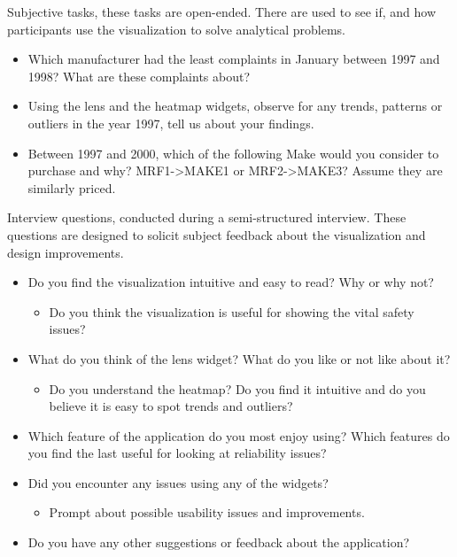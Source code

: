 \noindent 
Subjective tasks, these tasks are open-ended. There are used to see if, and how
participants use the visualization to solve analytical problems.

\begin{itemize}[noitemsep]
  \item Which manufacturer had the least complaints in January between 1997 and
  1998? What are these complaints about?
  \item Using the lens and the heatmap widgets, observe for any trends, patterns
  or outliers in the year 1997, tell us about your findings.
  \item Between 1997 and 2000, which of the following Make would you consider to
  purchase and why? MRF1->MAKE1 or MRF2->MAKE3? Assume they are similarly
  priced.
\end{itemize}

 
\noindent
Interview questions, conducted during a semi-structured interview. These
questions are designed to solicit subject feedback about the visualization and
design improvements.



\begin{itemize}
  \item Do you find the \threed visualization intuitive and easy to read? Why or
  why not?
  \begin{itemize}
    \item Do you think the visualization is useful for showing the vital safety
    issues?
  \end{itemize}
  
  \item What do you think of the lens widget? What do you like or not like about
  it?
  \begin{itemize}
    \item Do you understand the heatmap? Do you find it intuitive and do you
    believe it is easy to spot trends and outliers?
  \end{itemize}
  
  \item Which feature of the application do you most enjoy using? Which features
  do you find the last useful for looking at reliability issues? 
  
  \item Did you encounter any issues using any of the widgets? 
  \begin{itemize}
    \item  Prompt about possible usability issues and improvements.
  \end{itemize}
  
  \item Do you have any other suggestions or feedback about the application?
\end{itemize}